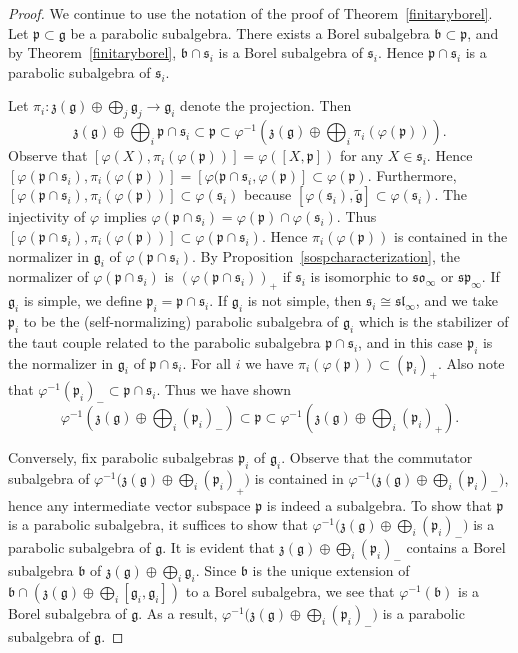 \documentclass{article}
\def\b{\mathfrak {b}}
\def\g{\mathfrak {g}}
\def\p{\mathfrak {p}}
\def\sl{\mathfrak{sl}}
\def\so{\mathfrak{so}}
\def\sp{\mathfrak{sp}}
\def\z{\mathfrak {z}}
\def\s{\mathfrak{s}}
\begin{document}
\begin{proof} 
We continue to use the notation of the proof of Theorem~\ref{finitaryborel}.  
Let $\p \subset \g$ be a parabolic subalgebra.  There exists a Borel subalgebra $\b \subset \p$, and by Theorem~\ref{finitaryborel}, $\b \cap \s_i$ is a Borel subalgebra of $\s_i$.  Hence $\p \cap \s_i$ is a parabolic subalgebra of $\s_i$.

Let $\pi_i \colon \z(\g) \oplus \bigoplus_j \g_j \rightarrow \g_i$ denote the projection.  Then 
$$\z(\g) \oplus \bigoplus_i \p \cap \s_i \subset \p \subset \varphi^{-1} \left( \z(\g) \oplus  \bigoplus_i \pi_i( \varphi(\p)) \right).$$
Observe that $[\varphi(X) , \pi_i (\varphi(\p))] = \varphi([X , \p])$ for any $X \in \s_i$.  Hence $[\varphi(\p \cap \s_i) , \pi_i(\varphi(\p)) ] = [\varphi(\p \cap \s_i , \varphi (\p) ] \subset \varphi (\p)$.  Furthermore, $[\varphi(\p \cap \s_i) , \pi_i (\varphi(\p))] \subset \varphi(\s_i)$ because $[\varphi(\s_i) , \tilde{\g} ] \subset \varphi(\s_i)$.  The injectivity of $\varphi$ implies $\varphi(\p \cap \s_i) = \varphi(\p) \cap \varphi(\s_i)$.  Thus $[\varphi(\p \cap \s_i) , \pi_i (\varphi(\p))]  \subset \varphi(\p \cap \s_i)$.  Hence $\pi_i (\varphi(\p))$ is contained in the normalizer in $\g_i$ of $\varphi(\p \cap \s_i)$.  By Proposition~\ref{sospcharacterization}, the normalizer of $\varphi(\p \cap \s_i)$ is $(\varphi(\p \cap \s_i))_+$ if $\s_i$ is isomorphic to $\so_\infty$ or $\sp_\infty$.  If $\g_i$ is simple, we define $\p_i = \p \cap \s_i$.  If $\g_i$ is not simple, then $\s_i \cong \sl_\infty$, and we take $\p_i$ to be the (self-normalizing) parabolic subalgebra of $\g_i$ which is the stabilizer of the taut couple related to the parabolic subalgebra $\p \cap \s_i$, and in this case $\p_i$ is the normalizer in $\g_i$ of $\p \cap \s_i$.  For all $i$ we have $\pi_i (\varphi(\p)) \subset (\p_i)_+$.  Also note that $\varphi^{-1}(\p_i)_- \subset \p \cap \s_i$.  Thus we have shown
$$\varphi^{-1} \left( \z(\g) \oplus \bigoplus_i (\p_i)_- \right) \subset \p \subset \varphi^{-1} \left( \z(\g) \oplus \bigoplus_i (\p_i)_+ \right).$$

Conversely, fix parabolic subalgebras $\p_i$ of $\g_i$.  Observe that the commutator subalgebra of $\varphi^{-1} \big( \z(\g) \oplus \bigoplus_i (\p_i)_+ \big)$ is contained in $\varphi^{-1} \big( \z(\g) \oplus \bigoplus_i (\p_i)_- \big)$, hence any intermediate vector subspace $\p$ is indeed a subalgebra.  
To show that $\p$ is a parabolic subalgebra, it suffices to show that $\varphi^{-1} \big( \z(\g) \oplus \bigoplus_i (\p_i)_- \big)$ is a parabolic subalgebra of $\g$.  It is evident that $\z(\g) \oplus \bigoplus_i (\p_i)_-$ contains a Borel subalgebra $\b$ of $\z(\g) \oplus \bigoplus_i \g_i$.  Since $\b$ is the unique extension of $\b \cap (\z(\g) \oplus \bigoplus_i [\g_i,\g_i])$ to a Borel subalgebra, we see that $\varphi^{-1} (\b)$ is a Borel subalgebra of $\g$.  As a result, $\varphi^{-1} \big( \z(\g) \oplus \bigoplus_i (\p_i)_- \big)$ is a parabolic subalgebra of $\g$.


\end{proof}
\end{document}
